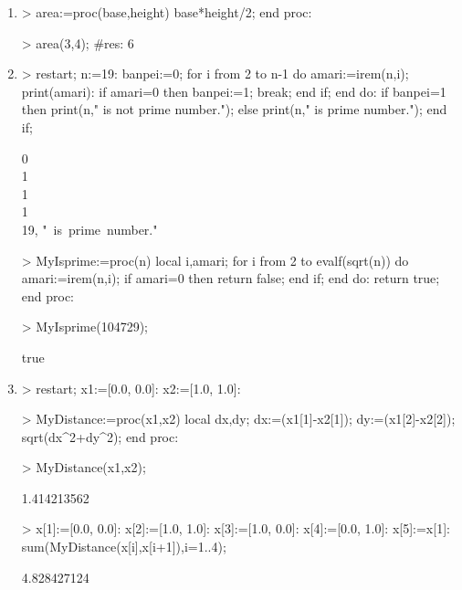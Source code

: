 \begin{enumerate}
\item
\begin{MapleInput}
> area:=proc(base,height) 
    base*height/2; 
  end proc:
\end{MapleInput}
\begin{MapleInput}
> area(3,4); #res: 6
\end{MapleInput}

\item
\begin{MapleInput}
> restart; 
  n:=19: 
  banpei:=0; 
  for i from 2 to n-1 do 
    amari:=irem(n,i);
    print(amari): 
    if amari=0 then 
      banpei:=1; 
      break;
    end if; 
  end do: 
  if banpei=1 then 
    print(n," is not prime number."); 
  else 
    print(n," is prime number."); 
  end if;
\end{MapleInput}
\begin{MapleOutputGather}
0 \notag \\
1 \notag \\
1 \notag \\
1 \notag \\
19, "\, is\, prime\, number." \notag
\end{MapleOutputGather}

\begin{MapleInput}
> MyIsprime:=proc(n) 
    local i,amari; 
    for i from 2 to evalf(sqrt(n)) do
      amari:=irem(n,i); 
      if amari=0 then 
        return false; 
      end if; 
    end do:
    return true;
  end proc:
\end{MapleInput}

\begin{MapleInput}
> MyIsprime(104729);
\end{MapleInput}
\begin{MapleOutput}
true
\end{MapleOutput}

\item 
\begin{MapleInput}
> restart; x1:=[0.0, 0.0]: x2:=[1.0, 1.0]:
\end{MapleInput}

\begin{MapleInput}
> MyDistance:=proc(x1,x2) 
    local dx,dy; 
    dx:=(x1[1]-x2[1]); 
    dy:=(x1[2]-x2[2]);
    sqrt(dx^2+dy^2); 
  end proc:
\end{MapleInput}
\begin{MapleInput}
> MyDistance(x1,x2);
\end{MapleInput}
\begin{MapleOutput}
1.414213562
\end{MapleOutput}
\begin{MapleInput}
> x[1]:=[0.0, 0.0]: x[2]:=[1.0, 1.0]: x[3]:=[1.0, 0.0]: x[4]:=[0.0, 1.0]: x[5]:=x[1]: 
  sum(MyDistance(x[i],x[i+1]),i=1..4);
\end{MapleInput}
\begin{MapleOutput}
4.828427124
\end{MapleOutput}


\end{enumerate}
